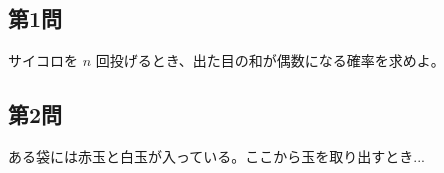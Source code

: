 
\subsection*{第1問}
サイコロを $n$ 回投げるとき、出た目の和が偶数になる確率を求めよ。

\subsection*{第2問}
ある袋には赤玉と白玉が入っている。ここから玉を取り出すとき...